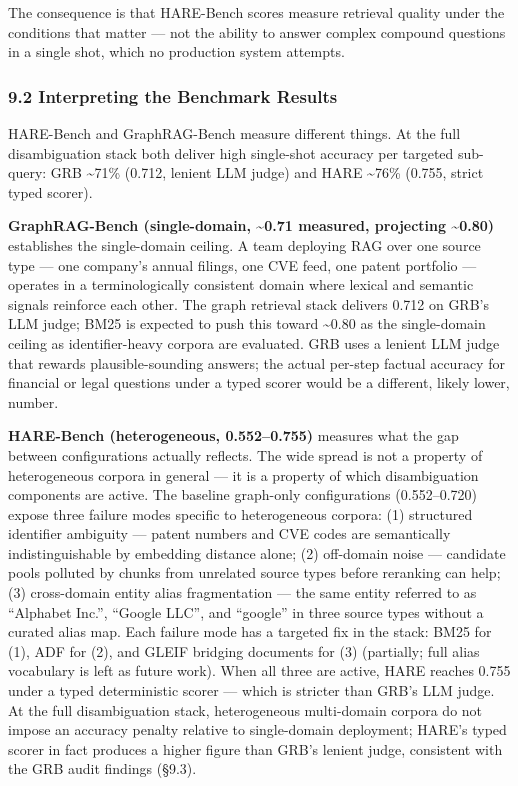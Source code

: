 The consequence is that HARE-Bench scores measure retrieval quality under the conditions that matter --- not the ability to answer complex compound questions in a single shot, which no production system attempts.

\subsubsection{9.2 Interpreting the Benchmark Results}\label{interpreting-the-benchmark-results}

HARE-Bench and GraphRAG-Bench measure different things. At the full disambiguation stack both deliver high single-shot accuracy per targeted sub-query: GRB \textasciitilde71\% (0.712, lenient LLM judge) and HARE \textasciitilde76\% (0.755, strict typed scorer).

\textbf{GraphRAG-Bench (single-domain, \textasciitilde0.71 measured, projecting \textasciitilde0.80)} establishes the single-domain ceiling. A team deploying RAG over one source type --- one company's annual filings, one CVE feed, one patent portfolio --- operates in a terminologically consistent domain where lexical and semantic signals reinforce each other. The graph retrieval stack delivers 0.712 on GRB's LLM judge; BM25 is expected to push this toward \textasciitilde0.80 as the single-domain ceiling as identifier-heavy corpora are evaluated. GRB uses a lenient LLM judge that rewards plausible-sounding answers; the actual per-step factual accuracy for financial or legal questions under a typed scorer would be a different, likely lower, number.

\textbf{HARE-Bench (heterogeneous, 0.552--0.755)} measures what the gap between configurations actually reflects. The wide spread is not a property of heterogeneous corpora in general --- it is a property of which disambiguation components are active. The baseline graph-only configurations (0.552--0.720) expose three failure modes specific to heterogeneous corpora: (1) structured identifier ambiguity --- patent numbers and CVE codes are semantically indistinguishable by embedding distance alone; (2) off-domain noise --- candidate pools polluted by chunks from unrelated source types before reranking can help; (3) cross-domain entity alias fragmentation --- the same entity referred to as ``Alphabet Inc.'', ``Google LLC'', and ``google'' in three source types without a curated alias map. Each failure mode has a targeted fix in the stack: BM25 for (1), ADF for (2), and GLEIF bridging documents for (3) (partially; full alias vocabulary is left as future work). When all three are active, HARE reaches 0.755 under a typed deterministic scorer --- which is stricter than GRB's LLM judge. At the full disambiguation stack, heterogeneous multi-domain corpora do not impose an accuracy penalty relative to single-domain deployment; HARE's typed scorer in fact produces a higher figure than GRB's lenient judge, consistent with the GRB audit findings (§9.3).

